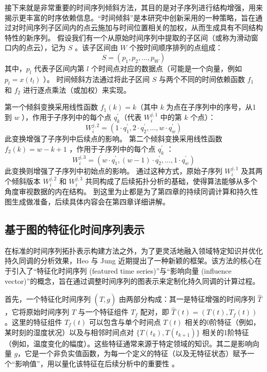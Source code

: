 接下来就是非常重要的时间序列倾斜方法，其目的是对子序列进行结构增强，用来揭示更丰富的时序依赖信息。“时间倾斜”是本研究中创新采用的一种策略，旨在通过对时间序列子区间内的点云施加与时间位置相关的加权，从而生成具有不同结构特性的新序列。
假设我们有一个从原始时间序列中提取的子区间（或称为滑动窗口内的点云），记为 $S$ 。该子区间由 $W$ 个按时间顺序排列的点组成：
\begin{equation}
    S=\left(p_1, p_2, \ldots, p_W\right)
\end{equation}
其中，$p_l$ 代表子区间内第 $l$ 个时间点对应的数据点（可能是一个向量，例如 $p_l=x\left(t_l\right)$ ）。
时间倾斜方法通过将此子区间 $S$ 与两个不同的时间依赖函数 $f_1$ 和 $f_2$ 进行逐点乘法（或加权）来实现。

第一个倾斜变换采用线性函数 $f_1(k)=k$（其中 $k$ 为点在子序列中的序号，从1到 $w$ ），作用于子序列中的每个点 $q_k^{\prime}$（代表 $W_i^{j, 1}$ 中的第 $k$ 个点）：
$$
    W_i^{j, 2}=\left(1 \cdot q_1^{\prime}, 2 \cdot q_2^{\prime}, \ldots, w \cdot q_w^{\prime}\right)
$$
此变换增强了子序列中后续点的影响。
第二个倾斜变换采用线性函数 $f_2(k)=w-k+1$ ，作用于子序列中的每个点 $q_k^{\prime}$ ：
$$
    W_i^{j, 3}=\left(w \cdot q_1^{\prime},(w-1) \cdot q_2^{\prime}, \ldots, 1 \cdot q_w^{\prime}\right)
$$
此变换则增强了子序列中初始点的影响。
通过这种方式，原始子序列 $W_i^{j, 1}$ 及其两个倾斜版本 $W_i^{j, 2}$ 和 $W_i^{j, 3}$ 共同构成了后续拓扑分析的基础，使得算法能够从多个角度审视数据的内在结构。
到这里为止都是为了第四章的持续同调计算和持久性图生成做准备，后续具体内容会在第四章详细讲解。

\subsection{基于图的特征化时间序列表示} %
在标准的时间序列拓扑表示构建方法之外，为了更灵活地融入领域特定知识并优化持久同调的分析效果，Heo 与 Jung \cite{2} 近期提出了一种新颖的框架。该方法的核心在于引入了“特征化时间序列 (featured time series)”与“影响向量 (influence vector)”的概念，旨在通过调整时间序列的图表示来定制化持久同调的计算过程。

首先，一个特征化时间序列 $(\hat{T}, g)$ 由两部分构成：其一是特征增强的时间序列 $\hat{T}$，它将原始时间序列 $T$ 与一个特征组件 $T_f$ 配对，即 $\hat{T}(t) = (T(t), T_f(t))$。这里的特征组件 $T_f(t)$ 可以包含与单个时间点 $T(t)$ 相关的0阶特征（例如，某时刻的湿度状况）以及与相邻时间点对 $\{T(t_k), T(t_{k+1})\}$ 相关的1阶特征（例如，温度变化的幅度）。这些特征通常来源于特定领域的知识。其二是影响向量 $g$，它是一个非负实值函数，为每一个定义的特征（以及无特征状态）赋予一个“影响值”，用以量化该特征在后续分析中的重要性 。

